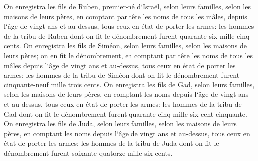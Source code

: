 \verse On enregistra les fils de Ruben, premier-né d`Israël, selon leurs familles, selon les maisons de leurs pères, en comptant par tête les noms de tous les mâles, depuis l`âge de vingt ans et au-dessus, tous ceux en état de porter les armes: 
\verse les hommes de la tribu de Ruben dont on fit le dénombrement furent quarante-six mille cinq cents. 
\verse On enregistra les fils de Siméon, selon leurs familles, selon les maisons de leurs pères; on en fit le dénombrement, en comptant par tête les noms de tous les mâles depuis l`âge de vingt ans et au-dessus, tous ceux en état de porter les armes: 
\verse les hommes de la tribu de Siméon dont on fit le dénombrement furent cinquante-neuf mille trois cents. 
\verse On enregistra les fils de Gad, selon leurs familles, selon les maisons de leurs pères, en comptant les noms depuis l`âge de vingt ans et au-dessus, tous ceux en état de porter les armes: 
\verse les hommes de la tribu de Gad dont on fit le dénombrement furent quarante-cinq mille six cent cinquante. 
\verse On enregistra les fils de Juda, selon leurs familles, selon les maisons de leurs pères, en comptant les noms depuis l`âge de vingt ans et au-dessus, tous ceux en état de porter les armes: 
\verse les hommes de la tribu de Juda dont on fit le dénombrement furent soixante-quatorze mille six cents. 
